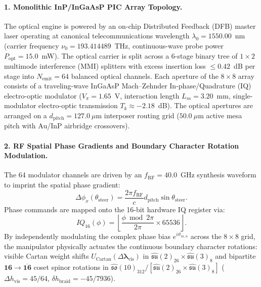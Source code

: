 \documentclass[11pt,onecolumn]{article}
\begin{document}
\paragraph{1. Monolithic InP/InGaAsP PIC Array Topology.}
The optical engine is powered by an on-chip Distributed Feedback (DFB) master laser operating at canonical telecommunications wavelength $\lambda_0 = 1550.00$~nm (carrier frequency $\nu_0 = 193.414489$~THz, continuous-wave probe power $P_{\mathrm{opt}} = 15.0$~mW). The optical carrier is split across a 6-stage binary tree of $1 \times 2$ multimode interference (MMI) splitters with excess insertion loss $\le 0.42$~dB per stage into $N_{\mathrm{emit}} = 64$ balanced optical channels. Each aperture of the $8 \times 8$ array consists of a traveling-wave InGaAsP Mach--Zehnder In-phase/Quadrature (IQ) electro-optic modulator ($V_\pi = 1.65$~V, interaction length $L_m = 3.20$~mm, single-modulator electro-optic transmission $T_k \approx -2.18$~dB). The optical apertures are arranged on a $d_{\mathrm{pitch}} = 127.0~\mu\text{m}$ interposer routing grid ($50.0~\mu\text{m}$ active mesa pitch with Au/InP airbridge crossovers).

\paragraph{2. RF Spatial Phase Gradients and Boundary Character Rotation Modulation.}
The 64 modulator channels are driven by an $f_{\mathrm{RF}} = 40.0$~GHz synthesis waveform to imprint the spatial phase gradient:
\begin{equation}
\label{eq:inp_phase_grad}
\Delta \phi_x(\theta_{\mathrm{steer}}) = \frac{2\pi f_{\mathrm{RF}}}{c} d_{\mathrm{pitch}} \sin \theta_{\mathrm{steer}}.
\end{equation}
Phase commands are mapped onto the 16-bit hardware IQ register via:
\begin{equation}
\label{eq:inp_iq_map}
IQ_{16}(\phi) = \left\lfloor \frac{\phi \bmod 2\pi}{2\pi} \times 65536 \right\rfloor.
\end{equation}
By independently modulating the complex phase bias $e^{i\vartheta_{m,n}}$ across the $8\times 8$ grid, the manipulator physically actuates the continuous boundary character rotations: visible Cartan weight shifts $U_{\mathrm{Cartan}}(\Delta\bm{\lambda}_{\mathrm{vis}})$ in $\widehat{\mathfrak{su}}(2)_{26} \times \widehat{\mathfrak{su}}(3)_8$ and bipartite $\mathbf{16} \to \overline{\mathbf{16}}$ coset spinor rotations in $\widehat{\mathfrak{so}}(10)_{312} / [\widehat{\mathfrak{su}}(2)_{26} \times \widehat{\mathfrak{su}}(3)_8]$ ($\Delta h_{\mathrm{vis}} = 45/64$, $\delta h_{\mathrm{braid}} = -45/7936$).
\end{document}
